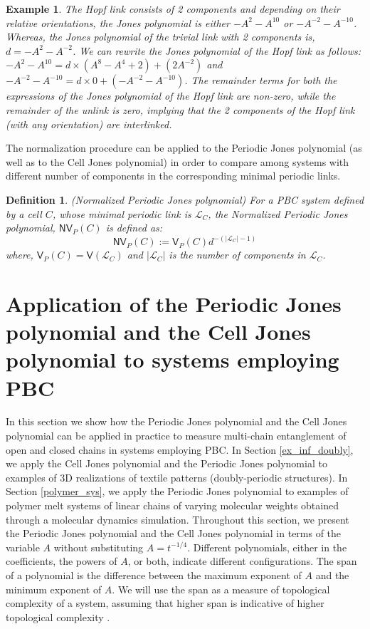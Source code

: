 \documentclass{article}
\newtheorem{definition}{Definition}[section]
\newtheorem{example}{Example}[section]
\begin{document}
\begin{example}
The Hopf link consists of 2 components and depending on their relative orientations, the Jones polynomial is either $-A^2-A^{10}$ or $-A^{-2}-A^{-10}$. Whereas, the Jones polynomial of the trivial link with 2 components is, $d=-A^{2}-A^{-2}$. We can rewrite the Jones polynomial of the Hopf link as follows: $-A^2-A^{10} = d\times (A^8-A^4+2) +(2A^{-2})$ and $-A^{-2}-A^{-10} = d\times 0 + (-A^{-2}-A^{-10})$.
The remainder terms for both the expressions of the Jones polynomial of the Hopf link are non-zero, while the remainder of the unlink is zero, implying that the 2 components of the Hopf link (with any orientation) are interlinked. 
\label{ex_qr_hopf}
\end{example}

The normalization procedure can be applied to the Periodic Jones polynomial (as well as to the Cell Jones polynomial) in order to compare among systems with different number of components in the corresponding minimal periodic links.

\begin{definition}(Normalized Periodic Jones polynomial) For a PBC system defined by a cell $C$, whose minimal periodic link is $\mathcal{L}_C$, the Normalized Periodic Jones polynomial, $\mathsf{NV}_P(C)$ is defined as:
\begin{equation}
    \mathsf{NV}_P(C) := \mathsf{V}_P(C) d^{-(|\mathcal{L}_C|-1)}%
    \label{NPJP}
\end{equation}
where, $\mathsf{V}_P(C)=\mathsf{V}(\mathcal{L}_C)$ and  $|\mathcal{L}_C|$ is the number of components in $\mathcal{L}_C$.
\label{NPJPinf}
\end{definition}

\section{Application of the Periodic Jones polynomial and the Cell Jones polynomial to systems employing PBC}\label{sec_app}

In this section we show how the Periodic Jones polynomial and the Cell Jones polynomial can be applied in practice to measure multi-chain entanglement of open and closed chains in systems employing PBC. In Section \ref{ex_inf_doubly}, we apply the Cell Jones polynomial and the Periodic Jones polynomial to examples of 3D realizations of textile patterns (doubly-periodic structures). In Section \ref{polymer_sys}, we apply the Periodic Jones polynomial to examples of polymer melt systems of linear chains of varying molecular weights obtained through a molecular dynamics simulation. Throughout this section, we present the Periodic Jones polynomial and the Cell Jones polynomial in terms of the variable $A$ without substituting $A=t^{-1/4}$. Different polynomials, either in the coefficients, the powers of $A$, or both, indicate different configurations. The span of a polynomial is the difference between the maximum exponent of $A$ and the minimum exponent of $A$. We will use the span as a measure of topological complexity of a system, assuming that higher span is indicative of higher topological complexity \cite{knot-book}. 
\end{document}
